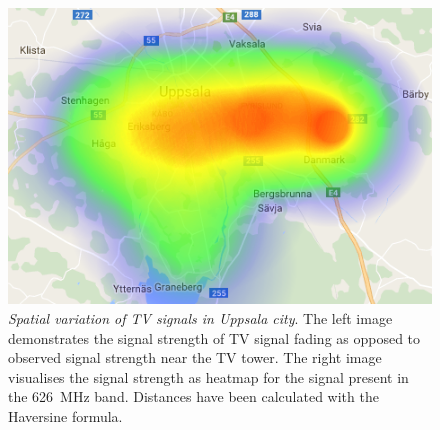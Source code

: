 \begin{figure}[h]
\begin{minipage}{0.49\columnwidth}
	\includegraphics[width=\columnwidth]{./fig/heatmap_626mhz}
	\end{minipage}
	\vspace{-10mm}
	\caption{\emph{Spatial variation of TV signals in Uppsala city}. 
	The left image demonstrates the signal strength of TV signal fading	
	as opposed to observed signal strength near the TV tower. 
	The right image visualises the signal strength as heatmap for the signal
	present in the \SI{626}{\mega\hertz} band. Distances have been
calculated with the Haversine formula. }
 	\vspace{-10mm}

\label{fig:haversine}
\end{figure}

